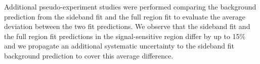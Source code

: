 Additional pseudo-experiment studies were performed comparing the background prediction
from the sideband fit and the full region fit to evaluate the average
deviation between the two fit predictions. We observe that 
the sideband fit and the full region fit predictions in the
signal-sensitive region differ by up to 15\% and we propagate an
additional systematic uncertainty to the sideband fit background
prediction to cover this average difference.


